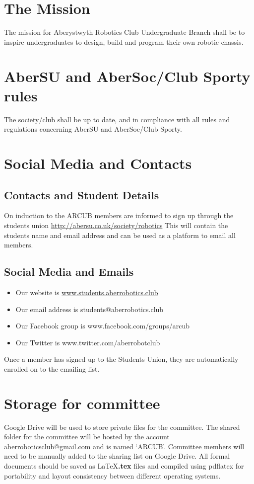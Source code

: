 \documentclass[a4paper,11pt]{article}
\begin{document}
\section{The Mission}
The mission for Aberystwyth Robotics Club Undergraduate Branch shall be to inspire undergraduates to design, build and program their own robotic chassis.

\section{AberSU and AberSoc/Club Sporty rules}
The society/club shall be up to date, and in compliance with all rules and regulations concerning AberSU and AberSoc/Club Sporty.

\section{Social Media and Contacts}
\subsection{Contacts and Student Details}
On induction to the ARCUB members are informed to sign up through the students union \url{http://abersu.co.uk/society/robotics}\newline
This will contain the students name and email address and can be used as a platform to email all members.

\subsection{Social Media and Emails}
\begin{itemize}[nolistsep]
  \item Our website is \url{www.students.aberrobotics.club}
  \item Our email address is students@aberrobotics.club
  \item Our Facebook group is www.facebook.com/groups/arcub
  \item Our Twitter is www.twitter.com/aberrobotclub
\end{itemize}
Once a member has signed up to the Students Union, they are automatically enrolled on to the emailing list.

\section{Storage for committee}
Google Drive will be used to store private files for the committee. The shared folder for the committee will be hosted by the account aberroboticsclub@gmail.com and is named ‘ARCUB’.\newline
Committee members will need to be manually added to the sharing list on Google Drive.\newline
All formal documents should be saved as \LaTeX \textbf{.tex} files and compiled using pdflatex for portability and layout consistency between different operating systems.
\end{document}
